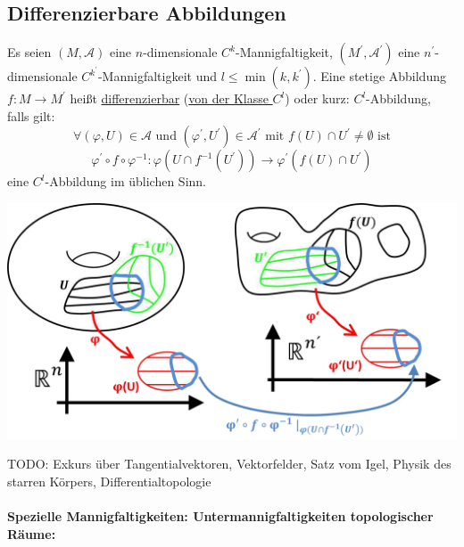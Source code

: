 \documentclass[a4paper,11pt,notitlepage]{report}
\theoremstyle{definition}
\newenvironment{definition}[1]{
	\begin{definitions}
	\marginnote{\emph{#1}}
}{\end{definitions}}
\begin{document}
\subsection{Differenzierbare Abbildungen}
\begin{definition}{$C^l$-Abbildung}
Es seien $(M, \mathcal{A})$ eine $n$-dimensionale $C^k$-Mannigfaltigkeit, $(M^\prime, \mathcal{A}^\prime)$ eine $n^\prime$-dimensionale $C^{k^\prime}$-Mannigfaltigkeit und $l \leq \min(k,k^\prime)$. Eine stetige Abbildung $f \colon M \rightarrow M^\prime$ heißt \underline{differenzierbar} (\underline{von der Klasse $C^l$}) oder kurz: $C^l$-Abbildung, falls gilt:
$$\forall (\varphi,U) \in \mathcal{A} \text{ und } (\varphi^\prime, U^\prime) \in \mathcal{A}^\prime \text{ mit } f(U) \cap U^\prime \neq \emptyset \text{ ist}$$
$$\boxed{\varphi^\prime \circ f \circ \varphi^{-1} \colon \varphi(U \cap f^{-1}(U^\prime)) \rightarrow \varphi^\prime(f(U)\cap U^\prime)}$$
eine $C^l$-Abbildung im üblichen Sinn.
\end{definition}
\begin{center}
	\includegraphics[scale=0.5]{images/Abb_diffbar.png}
\end{center}

TODO: Exkurs über Tangentialvektoren, Vektorfelder, Satz vom Igel, Physik des starren Körpers, Differentialtopologie

\newpage 
\paragraph{
Spezielle Mannigfaltigkeiten: Untermannigfaltigkeiten topologischer Räume: }
 
\end{document}
